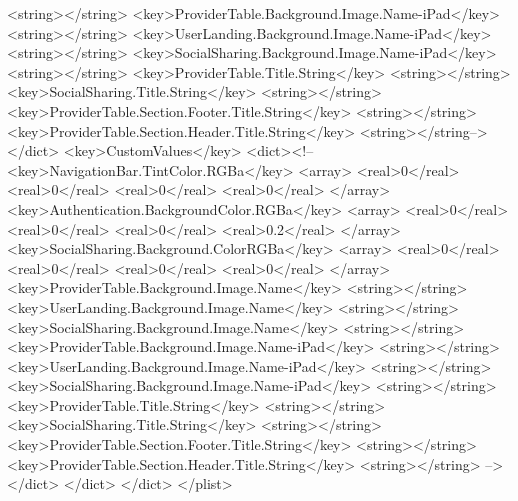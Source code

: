 \begin{DoxyCodeInclude}
                        <string></string>
                        <key>ProviderTable.Background.Image.Name-iPad</key>
                        <string></string>
                        <key>UserLanding.Background.Image.Name-iPad</key>
                        <string></string>
                        <key>SocialSharing.Background.Image.Name-iPad</key>
                        <string></string>
                        <key>ProviderTable.Title.String</key>
                        <string></string>
                        <key>SocialSharing.Title.String</key>
                        <string></string>
                        <key>ProviderTable.Section.Footer.Title.String</key>
                        <string></string>
                        <key>ProviderTable.Section.Header.Title.String</key>
                        <string></string-->
                </dict>
                <key>CustomValues</key>
                <dict><!--
                        <key>NavigationBar.TintColor.RGBa</key>
                        <array>
                                <real>0</real>
                                <real>0</real>
                                <real>0</real>
                                <real>0</real>
                        </array>
                        <key>Authentication.BackgroundColor.RGBa</key>
                        <array>
                                <real>0</real>
                                <real>0</real>
                                <real>0</real>
                                <real>0.2</real>
                        </array>
                        <key>SocialSharing.Background.ColorRGBa</key>
                                <array>
                                        <real>0</real>
                                        <real>0</real>
                                        <real>0</real>
                                        <real>0</real>
                                </array>
                        <key>ProviderTable.Background.Image.Name</key>
                        <string></string>
                        <key>UserLanding.Background.Image.Name</key>
                        <string></string>
                        <key>SocialSharing.Background.Image.Name</key>
                        <string></string>
                        <key>ProviderTable.Background.Image.Name-iPad</key>
                        <string></string>
                        <key>UserLanding.Background.Image.Name-iPad</key>
                        <string></string>
                        <key>SocialSharing.Background.Image.Name-iPad</key>
                        <string></string>
                        <key>ProviderTable.Title.String</key>
                        <string></string>
                        <key>SocialSharing.Title.String</key>
                        <string></string>
                        <key>ProviderTable.Section.Footer.Title.String</key>
                        <string></string>
                        <key>ProviderTable.Section.Header.Title.String</key>
                        <string></string> -->
                </dict>
        </dict>
</dict>
</plist>



\end{DoxyCodeInclude}
 